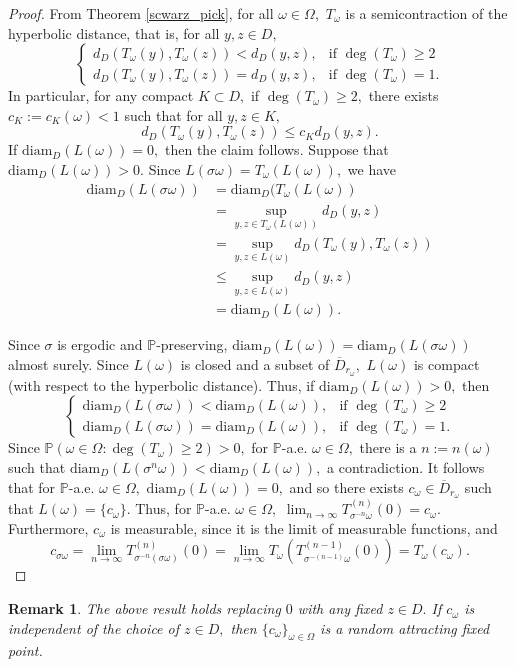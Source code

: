 \documentclass[12pt,reqno]{amsart}
\numberwithin{theorem}{section}
\newtheorem{remark}[theorem]{Remark}%
\begin{document}
\begin{proof}
    From Theorem \ref{scwarz_pick}, for all $\omega\in\Omega,$ $T_{\omega}$ is a semicontraction of the hyperbolic distance, that is, for all $y, z\in D,$ $$\begin{cases}
        d_{D}(T_{\omega}(y),T_{\omega}(z))<d_{D}(y,z),&\text{if }\deg(T_{\omega})\ge2\\d_{D}(T_{\omega}(y),T_{\omega}(z))=d_{D}(y,z),&\text{if }\deg(T_{\omega})=1.
    \end{cases}$$ In particular, for any compact $K\subset D,$ if $\deg(T_{\omega})\ge2,$ there exists $c_{K}:=c_{K}(\omega)<1$ such that for all $y,z\in K,$ $$d_{D}(T_{\omega}(y),T_{\omega}(z))\le c_{K}d_{D}(y,z).$$ If $\text{diam}_D(L(\omega))=0,$ then the claim follows. Suppose that $\text{diam}_D(L(\omega))>0.$  Since $L(\sigma\omega)=T_{\omega}(L(\omega)),$ we have \begin{align*}
        \text{diam}_D(L(\sigma\omega))&=\text{diam}_D(T_{\omega}(L(\omega))\\&=\sup_{y,z\in T_{\omega}(L(\omega))}d_{D}(y,z)\\&=\sup_{y,z\in L(\omega)}d_{D}(T_{\omega}(y), T_{\omega}(z))\\&\le\sup_{y,z\in L(\omega)}d_{D}(y,z)\\&=\text{diam}_D( L(\omega)).
\end{align*}

Since $\sigma$ is ergodic and $\mathbb{P}$-preserving, $\text{diam}_{D}(L(\omega))=\text{diam}_{D}(L(\sigma\omega))$ almost surely. Since $L(\omega)$ is closed and a subset of $\overline{D}_{r_\omega},$ $L(\omega)$ is compact (with respect to the hyperbolic distance). Thus, if $\text{diam}_{D}(L(\omega))>0,$ then $$\begin{cases}\text{diam}_{D}(L(\sigma\omega)) <\text{diam}_D(L(\omega)),&\text{if }\deg(T_{\omega})\ge2\\ \text{diam}_{D}(L(\sigma\omega))=\text{diam}_D(L(\omega)),&\text{if }\deg(T_{\omega})=1.\end{cases}$$ Since $\mathbb{P}(\omega\in\Omega:\deg(T_{\omega})\ge2)>0,$ for $\mathbb{P}$-a.e. $\omega\in\Omega,$ there is a $n:=n(\omega)$ such that $\text{diam}_{D}(L(\sigma^{n}\omega))<\text{diam}_{D}(L(\omega)),$ a contradiction.
  It follows that for $\mathbb{P}$-a.e. $\omega\in\Omega,$ $\text{diam}_{D}(L(\omega))=0,$ and so there exists $c_{\omega}\in\overline{D}_{r_{\omega}}$ such that $L(\omega)=\{c_{\omega}\}.$ 
Thus, for $\mathbb{P}$-a.e. $\omega\in\Omega,$ $\lim_{n\to\infty}T_{\sigma^{-n}\omega}^{(n)}(0)=c_{\omega}.$ Furthermore, $c_{\omega}$ is measurable, since it is the limit of measurable functions, and $$c_{\sigma\omega}=\lim_{n\to\infty}T_{\sigma^{-n}(\sigma\omega)}^{(n)}(0)=\lim_{n\to\infty}T_{\omega}(T_{\sigma^{-(n-1)}\omega}^{(n-1)}(0))=T_{\omega}(c_{\omega}).$$

\end{proof}
\begin{remark}
    The above result holds replacing $0$ with any fixed $z\in D.$ If $c_{\omega}$ is independent of the choice of $z\in D,$ then $\{c_{\omega}\}_{\omega\in\Omega}$ is a random attracting fixed point.
\end{remark}
\end{document}
